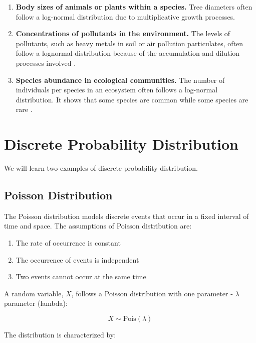 \documentclass[
]{book}
\providecommand{\tightlist}{%
  \setlength{\itemsep}{0pt}\setlength{\parskip}{0pt}}
\begin{document}
\begin{enumerate}
\def\labelenumi{\arabic{enumi}.}
\item
  \textbf{Body sizes of animals or plants within a species.} Tree diameters \citep{enquist2001} often follow a log-normal distribution due to multiplicative growth processes.
\item
  \textbf{Concentrations of pollutants in the environment.} The levels of pollutants, such as heavy metals in soil or air pollution particulates, often follow a lognormal distribution because of the accumulation and dilution processes involved \citep{ott1990}.
\item
  \textbf{Species abundance in ecological communities.} The number of individuals per species in an ecosystem often follows a log-normal distribution. It shows that some species are common while some species are rare \citep{preston1948}.
\end{enumerate}

\section{Discrete Probability Distribution}\label{discrete-probability-distribution}

We will learn two examples of discrete probability distribution.

\subsection{Poisson Distribution}\label{poisson-distribution}

The Poisson distribution models discrete events that occur in a fixed interval of time and space. The assumptions of Poisson distribution are:

\begin{enumerate}
\def\labelenumi{\arabic{enumi}.}
\tightlist
\item
  The rate of occurrence is constant
\item
  The occurrence of events is independent
\item
  Two events cannot occur at the same time
\end{enumerate}

A random variable, \(X\), follows a Poisson distribution with one parameter - \(\lambda\) parameter (lambda):

\[X \sim \text{Pois}(\lambda)\]

The distribution is characterized by:
\end{document}
